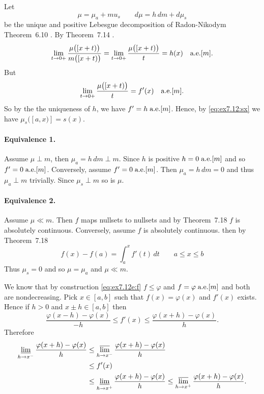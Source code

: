 \begin{enumerate}
\begin{itemize}
Let 
\begin{equation*}
\mu = \mu_a + mu_s \qquad  d\mu = h\,dm + d\mu_s
\end{equation*}
be the unique and positive Lebesgue decomposition 
of Radon-Nikodym Theorem~6.10 \cite{RudinRCA87}. 
By Theorem~7.14 \cite{RudinRCA87}.
\begin{equation*}
\lim_{t\to 0+} \frac{\mu\bigl([x+t)\bigr)}{m\bigl([x+t)\bigr)}
= \lim_{t\to 0+} \frac{\mu\bigl([x+t)\bigr)}{t}
= h(x) \quad \textrm{a.e.}[m].
\end{equation*}
But
\begin{equation*}
\lim_{t\to 0+} \frac{\mu\bigl([x+t)\bigr)}{t} = f'(x) \quad \textrm{a.e.}[m].
\end{equation*}
So by the the uniqueness of $h$, we have \(f' = h\;\textrm{a.e.}[m]\).
Hence, by \eqref{eq:ex7.12:sx} we have \(\mu_s([a,x)] = s(x)\).

\paragraph{Equivalence 1.}
Assume \(\mu\perp m\), then \(\mu_a = h\,dm \perp m\).
Since $h$ is positive \(h = 0\;\textrm{a.e.}[m]\) and so \(f'=0\;\textrm{a.e.}[m]\).
Conversely, assume  \(f'=0\;\textrm{a.e.}[m]\). Then \(\mu_a = h\,dm = 0\)
and thus \(\mu_a \perp m\) trivially.
Since \(\mu_s \perp m\) so is \(\mu\).

\paragraph{Equivalence 2.}
Assume  \(\mu \ll m\). Then $f$ maps nullsets to nullsets and 
by Theorem~7.18 \cite{RudinRCA87} $f$ is absolutely continuous.
Conversely, assume $f$ is absolutely continuous.
then by Theorem~7.18 \cite{RudinRCA87} 
\begin{equation*}
f(x) - f(a) = \int_a^x f'(t)\,dt  \qquad a\leq x \leq b
\end{equation*}
Thus \(\mu_s = 0\) and so \(\mu = \mu_a\) and \(\mu \ll m\).

We know that by construction \eqref{eq:ex7.12e:f}
 \(f \leq \varphi\) 
and \(f = \varphi\;\textrm{a.e.}[m]\) and both are nondecreasing.
Pick \(x\in[a,b]\) such that \(f(x) = \varphi(x)\) and \(f'(x)\) exists.
Hence if \(h>0\) and \(x\pm h \in [a,b]\) then
\begin{equation*}
     \frac{\varphi(x-h) - \varphi(x)}{-h} 
\leq f'(x) 
\leq \frac{\varphi(x+h) - \varphi(x)}{h}.
\end{equation*}
Therefore
\begin{align*}
     \varliminf_{h\to x^-} \frac{\varphi(x+h) - \varphi(x)}{h}
&\leq \varlimsup_{h\to x^-} \frac{\varphi(x+h) - \varphi(x)}{h} \\
&\leq f'(x) \\
&\leq \varliminf_{h\to x^+} \frac{\varphi(x+h) - \varphi(x)}{h}
\leq \varlimsup_{h\to x^+} \frac{\varphi(x+h) - \varphi(x)}{h}.
\end{align*}


\end{itemize}
\end{enumerate}
